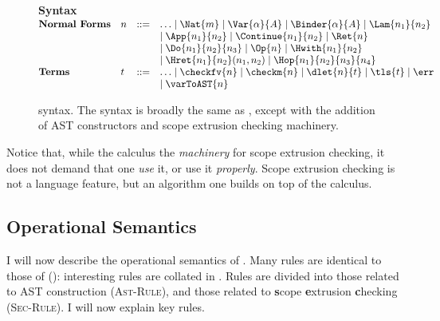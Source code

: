 \begin{figure}
\begin{core-desc}
  {\large \textbf{Syntax}} \\

  $\begin{array}{@{}llll}
    \textbf{Normal Forms} & n & ::= & \ldots \mid \Nat{m} \mid \Var{\alpha}{A} \mid \Binder{\alpha}{A} \mid \Lam{n_1}{n_2}  \\ 
  &&&\mid \App{n_1}{n_2} \mid \Continue{n_1}{n_2} \mid \Ret{n}   \\ 
  &&& \mid \Do{n_1}{n_2}{n_3} \mid \Op{n} \mid \Hwith{n_1}{n_2}   \\
  &&&\mid \Hret{n_1}{n_2}(n_1, n_2) \mid \Hop{n_1}{n_2}{n_3}{n_4} \\
  \textbf{Terms} & t & ::= & \ldots \mid \checkfv{n} \mid \checkm{n} \mid \dlet{n}{t} \mid \tls{t} \mid \err \\ &&& \mid \varToAST{n}
  \end{array}$
\end{core-desc}
\caption{\coreLang{} syntax. The syntax is broadly the same as \efflang{}, except with the addition of AST constructors and scope extrusion checking machinery.}
\label{fig:source-syntax}
\end{figure}

Notice that, while the calculus the \textit{machinery} for scope extrusion checking, it does not demand that one \textit{use} it, or use it \textit{properly}. Scope extrusion checking is not a language feature, but an algorithm one builds on top of the calculus. 
\subsection{Operational Semantics}
I will now describe the operational semantics of \coreLang{}. Many rules are identical to those of \efflang{} (): interesting rules are collated in . Rules are divided into those related to AST construction (\textsc{Ast-Rule}), and those related to \textbf{s}cope \textbf{e}xtrusion \textbf{c}hecking (\textsc{Sec-Rule}). I will now explain key rules. 

\newcommand{\coreConfiguration}[5]{{#1}; {#2}; {#3}; {#4}; {#5}}
  \newcommand{\astRule}[1]{\rulename{Ast}{#1}}
  \newcommand{\secRule}[1]{\rulename{Sec}{#1}}

